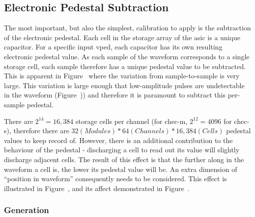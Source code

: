 \subsection{Electronic Pedestal Subtraction}

The most important, but also the simplest, calibration to apply is the subtraction of the electronic pedestal. Each cell in the storage array of the \gls{asic} is a unique capacitor. For a specific input \gls{vped}, each capacitor has its own resulting electronic pedestal value. As each sample of the waveform corresponds to a single storage cell, each sample therefore has a unique pedestal value to be subtracted. This is apparent in Figure~ where the variation from sample-to-sample is very large. This variation is large enough that low-amplitude pulses are undetectable in the waveform (Figure~)) and therefore it is paramount to subtract this per-sample pedestal.

There are $2^{14} = 16,384$ storage cells per channel (for \gls{chec-m}, $2^{12} = 4096$ for \gls{chec-s}), therefore there are $32 (Modules) * 64 (Channels) * 16,384 (Cells)$ pedestal values to keep record of. However, there is an additional contribution to the behaviour of the pedestal - discharging a cell to read out its value will slightly discharge adjacent cells. The result of this effect is that the further along in the waveform a cell is, the lower its pedestal value will be. An extra dimension of ``position in waveform'' consequently needs to be considered. This effect is illustrated in Figure~, and its affect demonstrated in Figure~.

\subsubsection{Generation}

